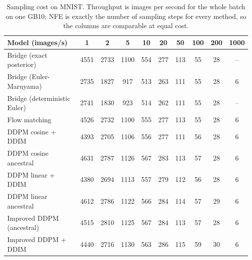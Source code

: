 \begin{table}[t]
\caption{Sampling cost on MNIST. Throughput is images per second for the whole batch on one GB10; NFE is exactly the number of sampling steps for every method, so the columns are comparable at equal cost.}
\centering
\small
\begin{tabular}{lccccccccc}
\toprule
Model (images/s) & 1 & 2 & 5 & 10 & 20 & 50 & 100 & 200 & 1000 \\
\midrule
Bridge (exact posterior) & 4551 & 2733 & 1100 & 554 & 277 & 113 & 55 & 28 & -- \\
Bridge (Euler-Maruyama) & 2735 & 1827 & 917 & 513 & 263 & 111 & 55 & 28 & 6 \\
Bridge (deterministic Euler) & 2741 & 1830 & 923 & 514 & 262 & 111 & 55 & 28 & -- \\
Flow matching & 4526 & 2732 & 1100 & 555 & 277 & 113 & 55 & 28 & 6 \\
DDPM cosine + DDIM & 4393 & 2705 & 1106 & 556 & 277 & 111 & 56 & 28 & 6 \\
DDPM cosine ancestral & 4631 & 2787 & 1126 & 567 & 283 & 113 & 57 & 28 & 6 \\
DDPM linear + DDIM & 4380 & 2694 & 1113 & 557 & 279 & 112 & 56 & 28 & 6 \\
DDPM linear ancestral & 4612 & 2786 & 1122 & 566 & 284 & 114 & 57 & 29 & 6 \\
Improved DDPM (ancestral) & 4515 & 2810 & 1125 & 567 & 284 & 113 & 57 & 28 & 6 \\
Improved DDPM + DDIM & 4440 & 2716 & 1130 & 563 & 286 & 115 & 59 & 30 & 6 \\
\bottomrule
\end{tabular}
\end{table}
